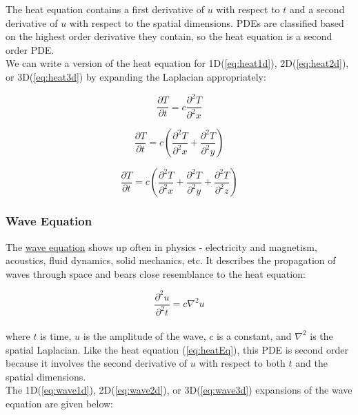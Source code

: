 {    The heat equation contains a first derivative of $u$ with respect to $t$ and a second derivative of $u$ with respect to the spatial dimensions.  PDEs are classified based on the highest order derivative they contain, so the heat equation is a second order PDE.\\
    
     We can write a version of the heat equation for 1D(\ref{eq:heat1d}), 2D(\ref{eq:heat2d}), or 3D(\ref{eq:heat3d}) by expanding the Laplacian appropriately:
 
 \begin{equation}\label{eq:heat1d}
  \frac{\partial T}{\partial t} = c\frac{\partial^{2}T}{\partial^{2}x}
  \end{equation}
  
   \begin{equation}\label{eq:heat2d}
  \frac{\partial T}{\partial t} = c\left(\frac{\partial^{2}T}{\partial^{2}x}+\frac{\partial^{2}T}{\partial^{2}y}\right)
  \end{equation}
  
   \begin{equation}\label{eq:heat3d}
  \frac{\partial T}{ \partial t} = c\left(\frac{\partial^{2}T}{\partial^{2}x}+\frac{\partial^{2}T}{\partial^{2}y}+\frac{\partial^{2}T}{\partial^{2}z} \right)
  \end{equation}
  
\subsubsection{Wave Equation}

 The \href{https://en.wikipedia.org/wiki/Wave_equation}{wave equation} shows up often in physics - electricity and magnetism, acoustics, fluid dynamics, solid mechanics, etc.  It describes the propagation of waves through space and bears close resemblance to the heat equation:

 \begin{equation}\label{eq:waveEq}
 \frac{\partial^{2}u}{\partial^{2}t} = c\nabla^{2}u
   \end{equation}
     \\
 where $t$ is time, $u$ is the amplitude of the wave, $c$ is a constant, and $\nabla^{2}$ is the spatial Laplacian.  Like the heat equation (\ref{eq:heatEq}), this PDE is second order because it involves the second derivative of $u$ with respect to both $t$ and the spatial dimensions. \\
 
The 1D(\ref{eq:wave1d}), 2D(\ref{eq:wave2d}), or 3D(\ref{eq:wave3d}) expansions of the wave equation are given below:
 
}
